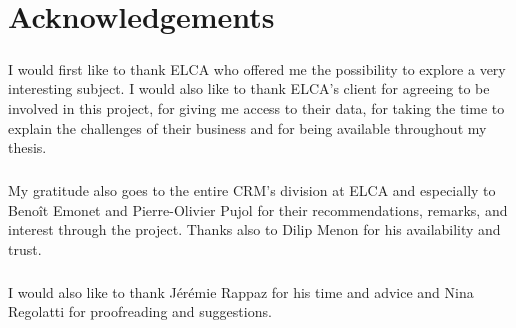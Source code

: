 \chapter*{Acknowledgements}

\vspace{0.5cm}

\paragraph{}
I would first like to thank ELCA who offered me the possibility to explore a very interesting subject. I would also like to thank ELCA's client for agreeing to be involved in this project, for giving me access to their data, for taking the time to explain the challenges of their business and for being available throughout my thesis.

\paragraph{}
My gratitude also goes to the entire CRM's division at ELCA and especially to Benoît Emonet and Pierre-Olivier Pujol for their recommendations, remarks, and interest through the project. Thanks also to Dilip Menon for his availability and trust.


\paragraph{}
I would also like to thank Jérémie Rappaz for his time and advice  and Nina Regolatti for proofreading and suggestions.